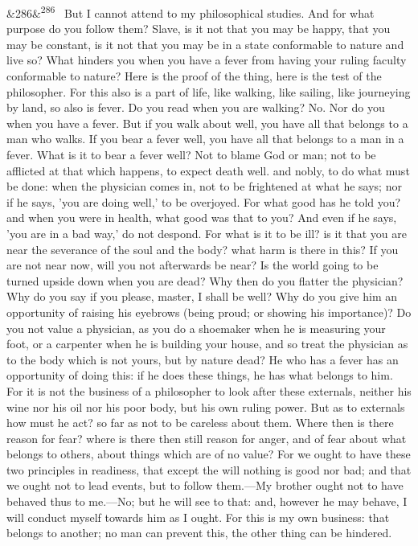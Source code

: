 \documentclass[12pt]{article}
\newcommand{\para}[1][]{\par\noindent\ifx&#1&\else\textsuperscript{\footnotesize #1}~\fi}
\begin{document}
\para[286] But I cannot attend to my philosophical studies. And for what purpose do you follow them? Slave, is it not that you may be happy, that you may be constant, is it not that you may be in a state conformable to nature and live so? What hinders you when you have a fever from having your ruling faculty conformable to nature? Here is the proof of the thing, here is the test of the philosopher. For this also is a part of life, like walking, like sailing, like journeying by land, so also is fever. Do you read when you are walking? No. Nor do you when you have a fever. But if you walk about well, you have all that belongs to a man who walks. If you bear a fever well, you have all that belongs to a man in a fever. What is it to bear a fever well? Not to blame God or man; not to be afflicted at that which happens, to expect death well. and nobly, to do what must be done: when the physician comes in, not to be frightened at what he says; nor if he says, 'you are doing well,' to be overjoyed. For what good has he told you? and when you were in health, what good was that to you? And even if he says, 'you are in a bad way,' do not despond. For what is it to be ill? is it that you are near the severance of the soul and the body? what harm is there in this? If you are not near now, will you not afterwards be near? Is the world going to be turned upside down when you are dead? Why then do you flatter the physician? Why do you say if you please, master, I shall be well? Why do you give him an opportunity of raising his eyebrows (being proud; or showing his importance)? Do you not value a physician, as you do a shoemaker when he is measuring your foot, or a carpenter when he is building your house, and so treat the physician as to the body which is not yours, but by nature dead? He who has a fever has an opportunity of doing this: if he does these things, he has what belongs to him. For it is not the business of a philosopher to look after these externals, neither his wine nor his oil nor his poor body, but his own ruling power. But as to externals how must he act? so far as not to be careless about them. Where then is there reason for fear? where is there then still reason for anger, and of fear about what belongs to others, about things which are of no value? For we ought to have these two principles in readiness, that except the will nothing is good nor bad; and that we ought not to lead events, but to follow them.—My brother ought not to have behaved thus to me.—No; but he will see to that: and, however he may behave, I will conduct myself towards him as I ought. For this is my own business: that belongs to another; no man can prevent this, the other thing can be hindered.
\end{document}
